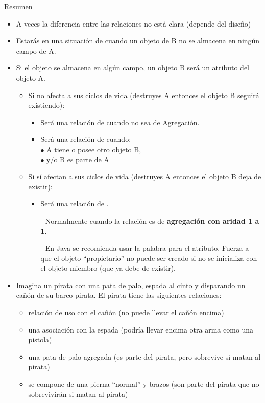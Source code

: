 \documentclass[10pt,envcountsect,spanish]{beamer}
\begin{document}
\begin{frame}[fragile]{Resumen} 

\begin{itemize}
\item A veces la diferencia entre las relaciones no está clara (depende del diseño)
\item Estarás en una situación de  cuando un objeto de B no se almacena en ningún campo de A.
\item Si el objeto se almacena en algún campo, un objeto B será un atributo del objeto A.

\begin{itemize}
	\item Si no afecta a sus ciclos de vida (destruyes A entonces el objeto B seguirá existiendo):

	\begin{itemize}
	\item Será una relación de  cuando no sea de Agregación.
	\item Será una relación de  cuando:\\
		$\bullet$ A tiene o posee otro objeto B,  \\
		$\bullet$  y/o B es parte de A
	\end{itemize}

\item Si sí afectan a sus ciclos de vida (destruyes A entonces el objeto B deja de existir):

	\begin{itemize}
	\item Será una relación de .
	\item[-] Normalmente cuando la relación es de \textbf{agregación con aridad 1 a 1}.
	\item[-] En Java se recomienda usar la palabra  para el atributo. Fuerza a que el objeto ``propietario'' no puede ser creado si no se inicializa con el objeto miembro (que ya debe de existir).
	\end{itemize}
\end{itemize}


\item \unEjemplo Imagina un pirata con una pata de palo, espada al cinto y disparando un cañón de su barco pirata. El pirata tiene las siguientes relaciones:
	\begin{itemize}
	\item relación de uso con el cañón (no puede llevar el cañón encima)
	\item una asociación con la espada (podría llevar encima otra arma como una pistola)
	\item una pata de palo agregada (es parte del pirata, pero sobrevive si matan al pirata)
	\item se compone de una pierna ``normal'' y brazos (son parte del pirata que no sobrevivirán si matan al pirata)
	\end{itemize}
	
\end{itemize}
\end{frame}
\end{document}
